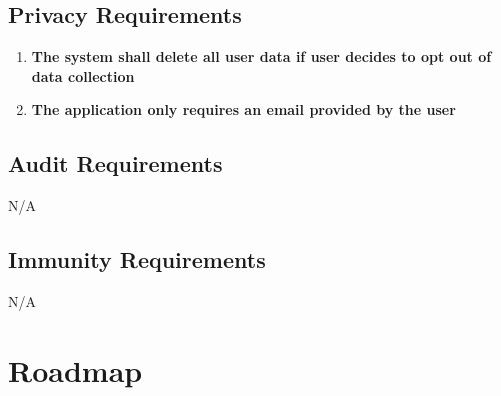 \documentclass{article}
\begin{document}
\subsection{Privacy Requirements}
\begin{enumerate}[{PR}1.]
    \item \textbf{The system shall delete all user data if user decides to opt out of data collection}
    \item \textbf{The application only requires an email provided by the user}
\end{enumerate}

\subsection{Audit Requirements}
N/A
\subsection{Immunity Requirements}
N/A


\section{Roadmap}

\end{document}
